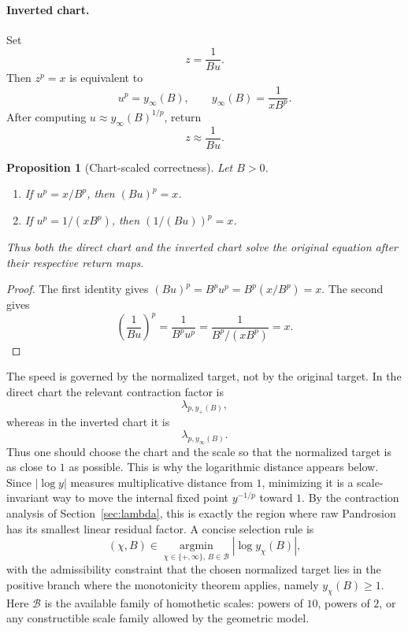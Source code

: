 \documentclass[10pt,a4paper]{article}
\theoremstyle{plain}
\newtheorem{proposition}[theorem]{Proposition}
\theoremstyle{definition}
\theoremstyle{remark}
\begin{document}
\paragraph{Inverted chart.}
Set
\[
  z=\frac{1}{B u}.
\]
Then $z^p=x$ is equivalent to
\begin{equation}
  u^p=y_\infty(B),
  \qquad
  y_\infty(B)=\frac{1}{xB^p}.
  \label{eq:inverted-chart-target}
\end{equation}
After computing $u\approx y_\infty(B)^{1/p}$, return
\[
  z\approx \frac{1}{B u}.
\]

\begin{proposition}[Chart-scaled correctness]
Let $B>0$.
\begin{enumerate}
  \item If $u^p=x/B^p$, then $(Bu)^p=x$.
  \item If $u^p=1/(xB^p)$, then $(1/(Bu))^p=x$.
\end{enumerate}
Thus both the direct chart and the inverted chart solve the original equation
after their respective return maps.
\end{proposition}

\begin{proof}
The first identity gives $(Bu)^p=B^p u^p=B^p(x/B^p)=x$.  The second gives
\[
  \left(\frac{1}{Bu}\right)^p
  =\frac{1}{B^p u^p}
  =\frac{1}{B^p/(xB^p)}=x.
\]
\end{proof}

The speed is governed by the normalized target, not by the original target.  In
the direct chart the relevant contraction factor is
\[
  \lambda_{p,y_+(B)},
\]
whereas in the inverted chart it is
\[
  \lambda_{p,y_\infty(B)}.
\]
Thus one should choose the chart and the scale so that the normalized target is
as close to $1$ as possible.  This is why the logarithmic distance appears
below.  Since $|\log y|$ measures multiplicative distance from $1$, minimizing
it is a scale-invariant way to move the internal fixed point
$y^{-1/p}$ toward $1$.  By the contraction analysis of
Section~\ref{sec:lambda}, this is exactly the region where raw Pandrosion has
its smallest linear residual factor.  A concise selection rule is
\begin{equation}
  (\chi,B)\in
  \operatorname*{argmin}_{\chi\in\{+,\infty\},\,B\in\mathcal B}
  \left|\log y_\chi(B)\right|,
  \label{eq:chart-selection}
\end{equation}
with the admissibility constraint that the chosen normalized target lies in the
positive branch where the monotonicity theorem applies, namely $y_\chi(B)\ge 1$.
Here $\mathcal B$ is
the available family of homothetic scales: powers of $10$, powers of $2$, or
any constructible scale family allowed by the geometric model.
\end{document}
